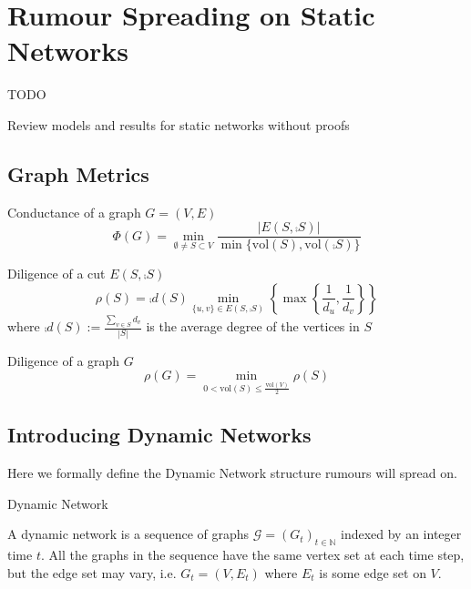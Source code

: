 \chapter{Rumour Spreading on Static Networks}\label{chapter:staticIntro}

TODO

Review models and results for static networks without proofs

\section{Graph Metrics}\label{section:graphMetrics}

\begin{definition}
	Conductance of a graph $G = (V, E)$
	$$
		\Phi(G) = \min_{\emptyset \neq S \subset V} \frac{|E(S, \comp{S})|}{\min\{\text{vol}(S), \text{vol}(\comp{S})\}}
	$$
\end{definition}

\begin{definition}
	Diligence of a cut $ E(S, \comp{S}) $
	$$
		\rho(S) = \comp{d}(S) \min_{\{u, v\} \in E(S, \comp{S}) } \left\{ \max \left\{ \frac{1}{d_u},\frac{1}{d_v} \right\} \right\}
	$$ 
	where $\comp{d}(S) := \frac{\sum_{v \in S} d_v}{|S|}$ is the average degree of the vertices in $S$
\end{definition}

\begin{definition} %
	Diligence of a graph $G$
	$$
		\rho(G) = \min_{0 < \text{vol}(S) \leq \frac{\text{vol}(V)}{2}} \rho(S) 
	$$
\end{definition}

\section{Introducing Dynamic Networks}

Here we formally define the Dynamic Network structure rumours will spread on.

\begin{definition}
	Dynamic Network

	\noindent
	A dynamic network is a sequence of graphs $\mathcal{G} = (G_t)_{t \in \mathbb{N}}$ indexed by an integer time $t$. All the graphs in the sequence have the same vertex set at each time step, but the edge set may vary, i.e.  $G_t = (V, E_t)$ where $E_t$ is some edge set on $V$.
\end{definition}

